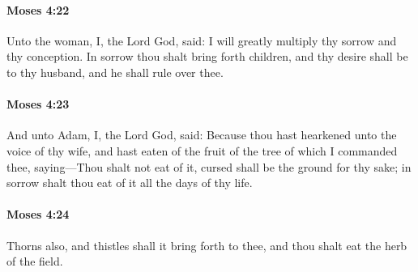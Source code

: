 		\paragraph{Moses 4:22} %
			\label{MOSES-4-22}

			Unto the woman, I, the Lord God, said: I will greatly multiply thy sorrow and thy conception. In sorrow thou shalt bring forth children, and thy desire shall be to thy husband, and he shall rule over thee.


		\paragraph{Moses 4:23} %
			\label{MOSES-4-23}

			And unto Adam, I, the Lord God, said: Because thou hast hearkened unto the voice of thy wife, and hast eaten of the fruit of the tree of which I commanded thee, saying---Thou shalt not eat of it, cursed shall be the ground for thy sake; in sorrow shalt thou eat of it all the days of thy life.


		\paragraph{Moses 4:24} %
			\label{MOSES-4-24}

			Thorns also, and thistles shall it bring forth to thee, and thou shalt eat the herb of the field.



